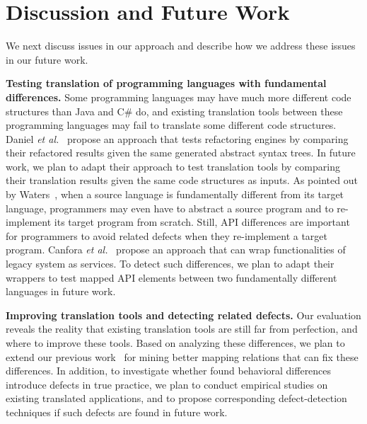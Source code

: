 

\section{Discussion and Future Work}
\label{sec:discuss}

We next discuss issues in our approach and describe how we address
these issues in our future work.

\textbf{Testing translation of programming languages with fundamental differences.} Some programming languages may have much more different code structures than Java and C\# do, and existing translation tools between these programming languages may fail to translate some different code structures. Daniel \emph{et al.}~\cite{daniel2007automated} propose an approach that tests refactoring engines by comparing their refactored results given the same generated abstract syntax trees. In future work, we plan to adapt their approach to test translation tools by comparing their translation results given the same code structures as inputs. As pointed out by Waters~\cite{waters1988program}, when a source language is fundamentally different from its target language, programmers may even have to abstract a source program and to re-implement its target program from scratch. Still, API differences are important for programmers to avoid related defects when they re-implement a target program. Canfora \emph{et al.}~\cite{CanforaFFT08} propose an approach that can wrap functionalities of legacy system as services. To detect such differences, we plan to adapt their wrappers to test mapped API elements between two fundamentally different languages in future work.

\textbf{Improving translation tools and detecting related defects.} Our evaluation reveals the reality that existing translation tools are still far from perfection, and where to improve these tools. Based on analyzing these differences, we plan to extend our previous work~\cite{zhong2010mining} for mining better mapping relations that can fix these differences. In addition, to investigate whether found behavioral differences introduce defects in true practice, we plan to conduct empirical studies on existing translated applications, and to propose corresponding defect-detection techniques if such defects are found in future work.

